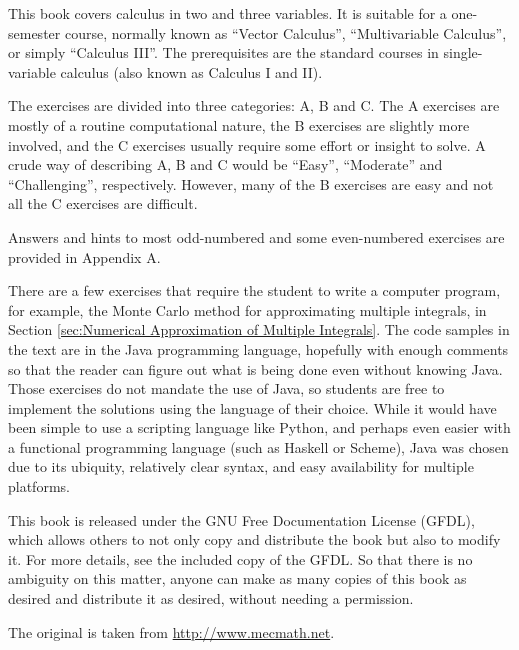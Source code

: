 This book covers calculus in two and three variables. It is suitable for a one-semester course, normally known as
``Vector Calculus'', ``Multivariable Calculus'', or simply ``Calculus III''. 
The prerequisites are the standard courses
in single-variable calculus (also known as Calculus I and II).

The exercises are divided into three categories: A, B and C. 
The A exercises are mostly
of a routine computational nature, the B exercises are slightly more involved, and the C exercises usually require
some effort or insight to solve. 
A crude way of describing A, B and C would be ``Easy'', ``Moderate'' and ``Challenging'', respectively. 
However, many of the B exercises are easy and not all
the C exercises are difficult.

Answers and hints to most odd-numbered and some even-numbered exercises are
provided in Appendix A. 

There are a few exercises that require the student to write a computer program,
for example, the Monte Carlo method for approximating multiple integrals, in
Section \ref{sec:Numerical Approximation of Multiple Integrals}.
The code samples in the text are in the Java programming language, hopefully with enough comments so that the reader can
figure out what is being done even without knowing Java. Those exercises do not mandate the use of Java, so
students are free to implement the solutions using the language of their choice. While it would have been simple to
use a scripting language like Python, and perhaps even easier with a functional programming language (such as Haskell or Scheme), 
Java was chosen due to its ubiquity, relatively clear syntax, and easy availability for multiple platforms.

This book is released under the GNU Free Documentation License (GFDL), which allows others to not only copy and
distribute the book but also to modify it. 
For more details, see the included copy of the GFDL. So that there is no
ambiguity on this matter, anyone can make as many copies of this book as desired and distribute it as desired,
without needing a permission.

The original is taken from \url{http://www.mecmath.net}. 
